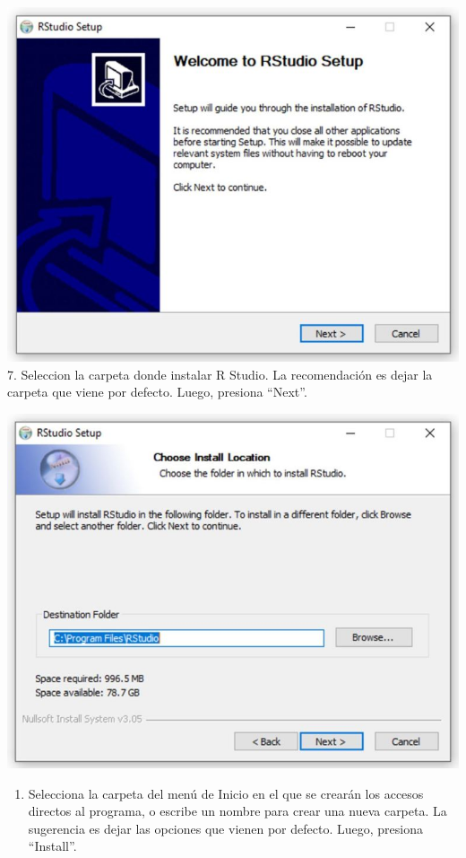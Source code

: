 \documentclass[
]{book}
\providecommand{\tightlist}{%
  \setlength{\itemsep}{0pt}\setlength{\parskip}{0pt}}
\begin{document}
\includegraphics{data/R06.jpg}
7. Seleccion la carpeta donde instalar R Studio. La recomendación es dejar la carpeta que viene por defecto. Luego, presiona ``Next''.

\includegraphics{data/R07.jpg}

\begin{enumerate}
\def\labelenumi{\arabic{enumi}.}
\setcounter{enumi}{7}
\tightlist
\item
  Selecciona la carpeta del menú de Inicio en el que se crearán los accesos directos al programa, o escribe un nombre para crear una nueva carpeta. La sugerencia es dejar las opciones que vienen por defecto. Luego, presiona ``Install''.
\end{enumerate}
\end{document}
